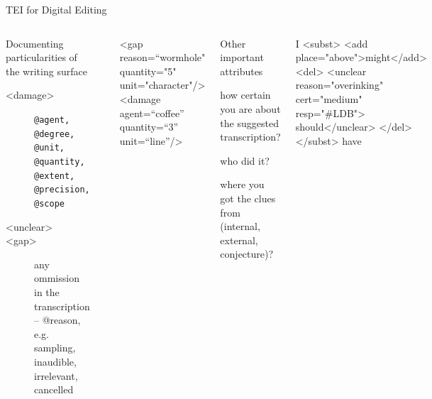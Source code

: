 \begin{frame}{TEI for Digital Editing}
\framebreak

\begin{columns}
\begin{alertblock}{Documenting particularities of the writing surface}\scriptsize
\begin{description}
\item[<damage>] \texttt{@agent, @degree, @unit, @quantity, @extent, @precision, @scope}
\item[<unclear>]
\item[<gap>] any ommission in the transcription -- @reason, e.g. sampling, inaudible, irrelevant, cancelled
\end{description}
\end{alertblock}

\includegraphics[width=0.5\textwidth]{img/tei-unclear.png}
\vspace{2em}

\begin{xmlcode}
<gap reason=“wormhole" quantity="5" unit="character"/>
<damage agent=“coffee” quantity=“3” unit=“line”/>
\end{xmlcode}

\begin{alertblock}{Other important attributes}
\begin{description}\scriptsize
    \item[@cert(ainty)] how certain you are about the suggested transcription?
    \item[@resp(onsibility)] who did it?
    \item[@evidence] where you got the clues from (internal, external, conjecture)?
\end{description}
\end{alertblock}

\begin{xmlcode}
I <subst>
 <add place="above">might</add>
  <del>
   <unclear reason="overinking"
      cert="medium" resp="#LDB"> 
      should</unclear>
  </del> </subst> have
\end{xmlcode}
\end{columns}


\end{frame}

